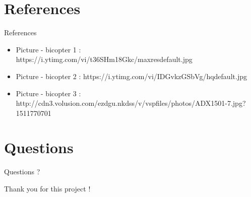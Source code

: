 \documentclass{beamer}
\begin{document}
\section{References}
\begin{frame}{References}
\begin{itemize}
\item Picture - bicopter 1 : https://i.ytimg.com/vi/t36SHm18Gkc/maxresdefault.jpg
\item Picture - bicopter 2 : https://i.ytimg.com/vi/IDGvkzGSbVg/hqdefault.jpg
\item Picture - bicopter 3 : http://cdn3.volusion.com/ezdgu.nkdss/v/vspfiles/photos/ADX1501-7.jpg?1511770701
\end{itemize}
\end{frame}

\section{Questions}
\begin{frame}{}
\huge{Questions ?}
\end{frame}

\begin{frame}{}
\huge{Thank you for this project !}
\end{frame}
\end{document}
